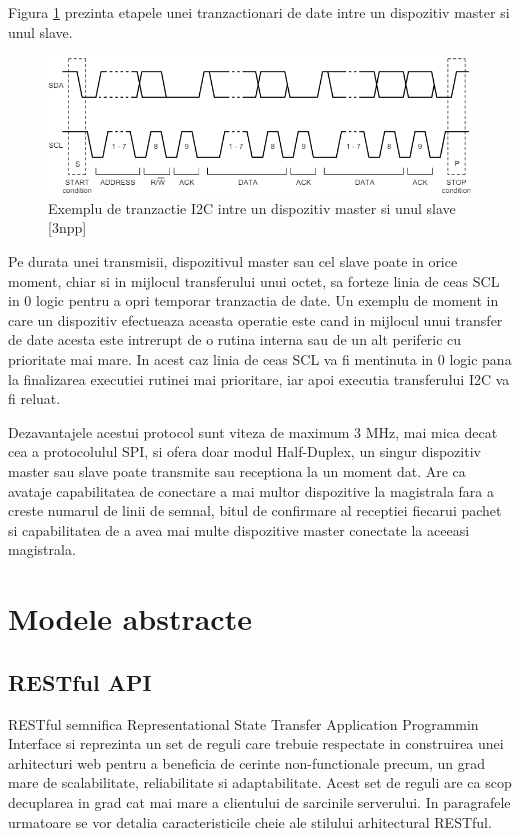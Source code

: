 Figura \ref{fig:I2CCompleteDataTransfer} prezinta etapele unei tranzactionari de date intre un dispozitiv master si unul slave.
\begin{figure}[H]
    \centering
    \includegraphics[scale=0.75]{figs/I2CCompleteDataTransfer.png}
    \caption{Exemplu de tranzactie I2C intre un dispozitiv master si unul slave [3npp]}
    \label{fig:I2CCompleteDataTransfer}
\end{figure}

Pe durata unei transmisii, dispozitivul master sau cel slave poate in orice moment, chiar si in mijlocul transferului unui octet, sa forteze linia de ceas SCL in 
0 logic pentru a opri temporar tranzactia de date. Un exemplu de moment in care un dispozitiv efectueaza aceasta operatie este cand in mijlocul unui transfer 
de date acesta este intrerupt de o rutina interna sau de un alt periferic cu prioritate mai mare. In acest caz linia de ceas SCL va fi mentinuta in 0 logic pana 
la finalizarea executiei rutinei mai prioritare, iar apoi executia transferului I2C va fi reluat. 

Dezavantajele acestui protocol sunt viteza de maximum 3 MHz, mai mica decat cea a protocolulul SPI, si ofera doar modul Half-Duplex, un singur dispozitiv master 
sau slave poate transmite sau receptiona la un moment dat. Are ca avataje capabilitatea de conectare a mai multor dispozitive la magistrala fara a creste numarul 
de linii de semnal, bitul de confirmare al receptiei fiecarui pachet si capabilitatea de a avea mai multe dispozitive master conectate la aceeasi magistrala.

\section{Modele abstracte}\label{sec:modele}
\subsection{RESTful API}\label{sec:restapi}
RESTful semnifica Representational State Transfer Application Programmin Interface si reprezinta un set de reguli care trebuie respectate in construirea 
unei arhitecturi web pentru a beneficia de cerinte non-functionale precum, un grad mare de scalabilitate, reliabilitate si adaptabilitate. Acest set de 
reguli are ca scop decuplarea in grad cat mai mare a clientului de sarcinile serverului. In paragrafele urmatoare se vor detalia caracteristicile cheie 
ale stilului arhitectural RESTful.

